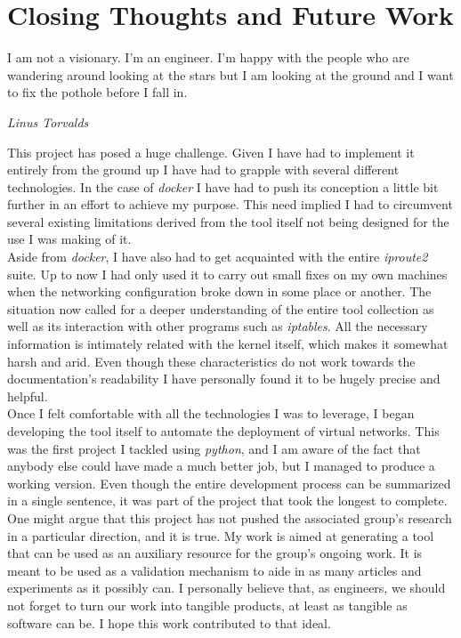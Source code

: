 \chapter{Closing Thoughts and Future Work}
    \epigraph{I am not a visionary. I'm an engineer. I'm happy with the people who are wandering around looking at the stars but I am
        looking at the ground and I want to fix the pothole before I fall in.}{\textit{Linus Torvalds}}

    This project has posed a huge challenge. Given I have had to implement it entirely from the ground up I have had to grapple with several different technologies. In the case of \textit{docker} I have had to push its conception a little bit further in an effort to achieve my purpose. This need implied I had to circumvent several existing limitations derived from the tool itself not being designed for the use I was making of it.\\

    Aside from \textit{docker}, I have also had to get acquainted with the entire \textit{iproute2} suite. Up to now I had only used it to carry out small fixes on my own machines when the networking configuration broke down in some place or another. The situation now called for a deeper understanding of the entire tool collection as well as its interaction with other programs such as \textit{iptables}. All the necessary information is intimately related with the kernel itself, which makes it somewhat harsh and arid. Even though these characteristics do not work towards the documentation's readability I have personally found it to be hugely precise and helpful.\\

    Once I felt comfortable with all the technologies I was to leverage, I began developing the tool itself to automate the deployment of virtual networks. This was the first project I tackled using \textit{python}, and I am aware of the fact that anybody else could have made a much better job, but I managed to produce a working version. Even though the entire development process can be summarized in a single sentence, it was part of the project that took the longest to complete.\\

    One might argue that this project has not pushed the associated group's research in a particular direction, and it is true. My work is aimed at generating a tool that can be used as an auxiliary resource for the group's ongoing work. It is meant to be used as a validation mechanism to aide in as many articles and experiments as it possibly can. I personally believe that, as engineers, we should not forget to turn our work into tangible products, at least as tangible as software can be. I hope this work contributed to that ideal.\\

